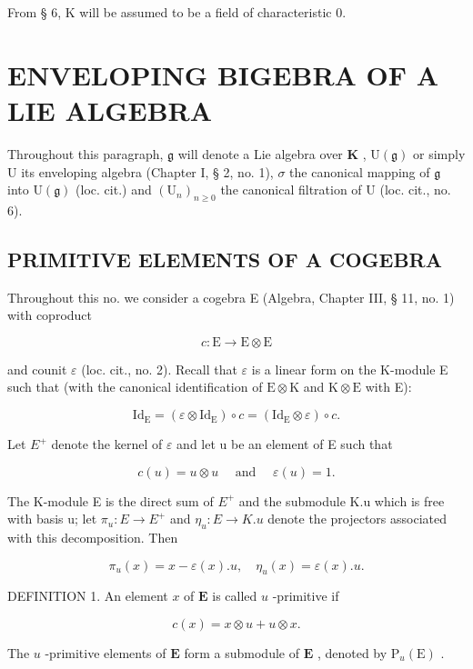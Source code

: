 From § 6, K will be assumed to be a field of characteristic 0.

\section{ENVELOPING BIGEBRA OF A LIE ALGEBRA}

Throughout this paragraph, \(\mathfrak{g}\) will denote a Lie algebra over \(\mathbf{K}\) , \(\mathrm{U}(\mathfrak{g})\) or simply \(\mathrm{U}\) its enveloping algebra (Chapter I, § 2, no. 1), \(\sigma\) the canonical mapping of \(\mathfrak{g}\) into \(\mathrm{U}(\mathfrak{g})\) (loc. cit.) and \((\mathrm{U}_n)_{n\geqslant 0}\) the canonical filtration of \(\mathrm{U}\) (loc. cit., no. 6).

\subsection{PRIMITIVE ELEMENTS OF A COGEBRA}

Throughout this no. we consider a cogebra E (Algebra, Chapter III, § 11, no. 1) with coproduct

\[
c \colon \mathrm{E} \rightarrow \mathrm{E} \otimes \mathrm{E}
\]

and counit \(\varepsilon\) (loc. cit., no. 2). Recall that \(\varepsilon\) is a linear form on the K-module E such that (with the canonical identification of \(\mathrm{E} \otimes \mathrm{K}\) and \(\mathrm{K} \otimes \mathrm{E}\) with E):

\[
\mathrm{Id} _ {\mathrm{E}} = (\varepsilon \otimes \mathrm{Id} _ {\mathrm{E}}) \circ c = (\mathrm{Id} _ {\mathrm{E}} \otimes \varepsilon) \circ c.
\]

Let \(E^{+}\) denote the kernel of \(\varepsilon\) and let u be an element of E such that

\[
c (u) = u \otimes u \quad \text { and } \quad \varepsilon (u) = 1.
\]

The K-module E is the direct sum of \(E^{+}\) and the submodule K.u which is free with basis u; let \(\pi_{u}: E \to E^{+}\) and \(\eta_{u}: E \to K.u\) denote the projectors associated with this decomposition. Then

\[
\pi_ {u} (x) = x - \varepsilon (x). u, \quad \eta_ {u} (x) = \varepsilon (x). u.\tag{1}
\]

DEFINITION 1. An element \(x\) of \(\mathbf{E}\) is called \(u\) -primitive if

\[
c (x) = x \otimes u + u \otimes x.\tag{2}
\]

The \(u\) -primitive elements of \(\mathbf{E}\) form a submodule of \(\mathbf{E}\) , denoted by \(\mathrm{P}_{u}(\mathrm{E})\) .

